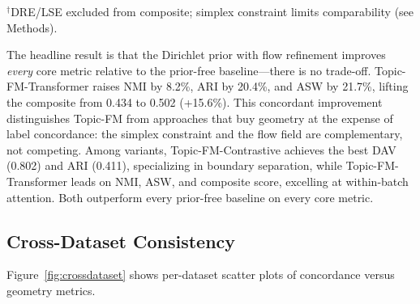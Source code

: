 \documentclass[biology,article,submit,pdftex,moreauthors]{Definitions/mdpi}
\begin{document}
\begin{table}[!htbp]
\centering
\caption{\textbf{56-dataset summary.} Mean metric values across the full catalogue. Higher is better except DAV. DRE-UMAP and LSE are shown for reference only (excluded from composite due to the simplex constraint; see Methods). Composite = (NMI\,+\,ARI\,+\,ASW)\,/\,3.}
\label{tab:topic_refresh}
\setlength{\tabcolsep}{4.5pt}
\small
{}

\footnotesize $^\dagger$DRE/LSE excluded from composite; simplex constraint limits comparability (see Methods).
\end{table}

The headline result is that the Dirichlet prior with flow refinement improves \emph{every} core metric relative to the prior-free baseline---there is no trade-off. Topic-FM-Transformer raises NMI by 8.2\%, ARI by 20.4\%, and ASW by 21.7\%, lifting the composite from 0.434 to 0.502 (+15.6\%). This concordant improvement distinguishes Topic-FM from approaches that buy geometry at the expense of label concordance: the simplex constraint and the flow field are complementary, not competing. Among variants, Topic-FM-Contrastive achieves the best DAV (0.802) and ARI (0.411), specializing in boundary separation, while Topic-FM-Transformer leads on NMI, ASW, and composite score, excelling at within-batch attention. Both outperform every prior-free baseline on every core metric.

\subsection{Cross-Dataset Consistency}
Figure~\ref{fig:crossdataset} shows per-dataset scatter plots of concordance versus geometry metrics.
\end{document}
